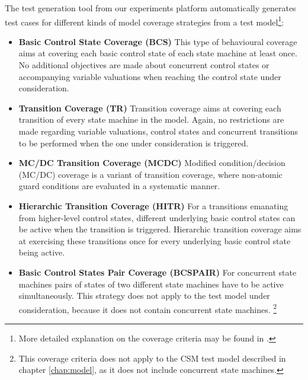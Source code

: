 The test generation tool from our experiments platform automatically
generates test cases for different kinds of model coverage strategies
from a test model\footnote{More detailed explanation on the coverage criteria may be found in \cite{D34.1}.}:
\begin{itemize}
\item {\bf Basic Control State Coverage (BCS)}\newline
      This type of behavioural coverage aims at covering each
      basic control state of each state machine at least once.
      No additional objectives are made about concurrent control
      states or accompanying variable valuations when reaching
      the control state under consideration.
\item {\bf Transition Coverage (TR)}\newline
      Transition coverage aims at covering each transition of
      every state machine in the model. Again, no restrictions
      are made regarding variable valuations, control states
      and concurrent transitions to be performed when the one
      under consideration is triggered.
\item {\bf MC/DC Transition Coverage (MCDC)}\newline
      Modified condition/decision (MC/DC) coverage is a variant
      of transition coverage, where non-atomic guard conditions
      are evaluated in a systematic manner.
\item {\bf Hierarchic Transition Coverage (HITR)}\newline
      For a transitions emanating from higher-level control states,
      different underlying basic control states can be active when
      the transition is triggered. Hierarchic transition coverage
      aims at exercising these transitions once for every underlying
      basic control state being active.
\item {\bf Basic Control States Pair Coverage (BCSPAIR)}\newline
      For concurrent state machines pairs of states of two
      different state machines have to be active simultaneously.
      This strategy does not apply to the test model under consideration,
      because it does not contain concurrent state machines.
      \footnote{This coverage criteria does not apply to the CSM
      test model described in chapter \ref{chap:model}, as it
      does not include concurrent state machines.}
\end{itemize}

